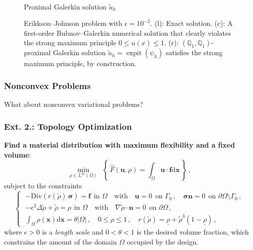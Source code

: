 \documentclass[aspectratio=169,xcolor=dvipsnames,11pt]{beamer}
\newcommand{\dd}{\mathrm{d}}
\DeclareMathOperator{\sigmoid}{expit} %
\begin{document}
\begin{frame}
\begin{figure}
\begin{minipage}{0.3\textwidth}
		\\
		Proximal Galerkin solution $\tilde{u}_h$
	\end{minipage}%
	\caption{
	Erikkson--Johnson problem with $\epsilon = 10^{-2}$.
	(l):  Exact solution.
	(c): A first-order Bubnov--Galerkin numerical solution that clearly violates the strong maximum principle $0 \leq u(x) \leq 1$.
	(r): $(\mathbb{Q}_1,\mathbb{Q}_1)$-proximal Galerkin solution $\tilde{u}_h = \sigmoid(\psi_h)$ satisfies the strong maximum principle, by construction.
	\label{fig:EJProblem}}
\end{figure}
\end{frame}

\begin{frame}\frametitle{Nonconvex Problems}
{\Large
{\color{Maroon}
What about nonconvex variational problems?
}
}
\end{frame}

\begin{frame}\frametitle{Ext. 2.: Topology Optimization}
\textbf{Find a material distribution with maximum flexibility and a fixed volume}:
\begin{equation}
\label{eq:elastic_compliance_objective}
    \min_{\rho \in L^{\infty}(\Omega)} \ \
    \left\{
    \,
    \widehat{F}(\mathbf{u},\rho)
    =
    \int_{ \Omega} \mathbf{u}\cdot\mathbf{f} \dd \bm{x}
    \,
    \right\}
    \, ,
\end{equation}
subject to the constraints
\begin{equation}
\label{eq:elastic_compliance_constraints}
\left\{\,\,
\begin{gathered}
    -\mathrm{Div} \left( r(\tilde{\rho})\,\bm{\sigma} \right) = \mathbf{f}
    ~~ \text{in }\Omega
    \quad\text{with}\quad
    \mathbf{u} = 0
    ~~\text{on }\Gamma_0
    \,,
    \quad
    \bm{\sigma} \mathbf{n} = 0
    ~~ \text{on }\partial\Omega \setminus \Gamma_0
    \,,
    \\
    -\epsilon^2\Delta \tilde{\rho} + \tilde{\rho}
	= \rho
	~~ \text{in }\Omega
	\quad\text{with}\quad
	\nabla \tilde{\rho}\cdot \mathbf{n} = 0
	~~ \text{on }\partial\Omega
    \,,
    \\
    \int_\Omega \rho(\bm{x}) \dd\bm{x}
    = \theta |\Omega|
    \,,\quad
    0 \leq \rho
    \leq 1
    \,,\quad
    r(\tilde{\rho})
    = \underline{\rho}+ \tilde{\rho}^3 (1-\underline{\rho})
    \,,
\end{gathered}
\right.
\end{equation}
where $\epsilon > 0$ is a \emph{length scale} and $0 < \theta < 1$ is the desired {volume fraction}, which constrains the amount of the domain $\Omega$ occupied by the design.
\end{frame}
\end{document}
